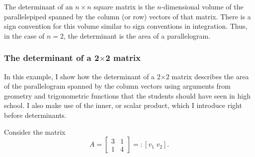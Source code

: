 \documentclass[graybox]{svmult}
\begin{document}
The determinant of an $n\times n$ square matrix is the $n$-dimensional volume of the parallelepiped spanned by the column (or row) vectors of that matrix. There is a sign convention for this volume similar to sign conventions in integration. Thus, in the case of $n=2$, the determinant is the area of a parallelogram.

\subsubsection{The determinant of a 2$\times$2 matrix}

In this example, I show how the determinant of a 2$\times$2 matrix describes the area of the parallelogram spanned by the column vectors using arguments from geometry and trigonometric functions that the students should have seen in high school. I also make use of the inner, or scalar product, which I introduce right before determinants.

Consider the matrix
\[ A= \left[ \begin{array}{cc}
3 & 1\\
1 & 4
\end{array}\right] =: [v_1\; v_2].
\]


\begin{center}
\usetikzlibrary{patterns}
\end{center}
\end{document}
